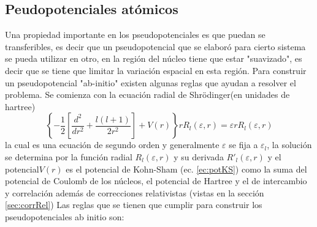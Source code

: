\documentclass[12pt,a4paper, oneside]{book}
\begin{document}
   \subsection{Peudopotenciales at\'omicos}
   Una propiedad importante en los pseudopotenciales es que puedan se transferibles, es decir que un pseudopotencial que se elabor\'o para cierto sistema se pueda utilizar en otro, en la regi\'on del n\'ucleo tiene que estar "suavizado", es decir que se tiene que limitar la variaci\'on espacial en esta regi\'on. Para construir un pseudopotencial "ab-initio" existen algunas reglas que ayudan a resolver el problema. Se comienza con la ecuaci\'on radial de Shr\"odinger(en unidades de hartree)
   \begin{equation}
   \left\{-\frac{1}{2} \left[\frac{d^2}{dr^2} + \frac{l (l+1)}{2 r^2} \right]+ V(r)\right\} r R_l (\varepsilon,r) = \varepsilon r R_l (\varepsilon,r) \label{ec:ShRadial}
   \end{equation}  
   la cual es una ecuaci\'on de segundo orden y generalmente $\varepsilon$ se fija a $\varepsilon_l$, la soluci\'on se determina por la funci\'on radial $R_l (\varepsilon,r)  $ y su derivada $R'_l (\varepsilon,r)  $  y el potencial$V(r)$ es el potencial de Kohn-Sham (ec. \ref{ec:potKS}) como la suma del potencial de Coulomb de los n\'ucleos, el potencial de Hartree y el de intercambio y correlaci\'on adem\'as de correcciones relativistas (vistas en la secci\'on \ref{sec:corrRel}) 
   \newline
   Las reglas que se tienen que cumplir para construir los pseudopotenciales ab initio son:
\end{document}
